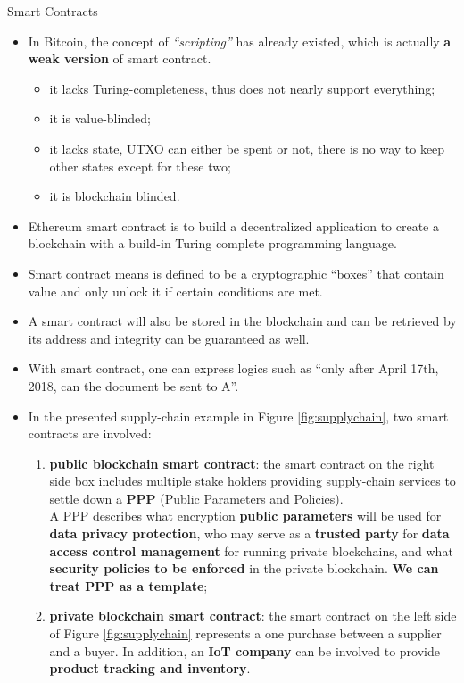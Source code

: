 \documentclass[11pt]{beamer}
\begin{document}
\begin{frame}[allowframebreaks]{Smart Contracts}
\begin{itemize}
\item In Bitcoin, the concept of \textit{“scripting”} has already existed, which is actually \textbf{a weak version} of smart contract.
\begin{itemize}
	\item it lacks Turing-completeness, thus does not nearly support everything;
	\item it is value-blinded;
	\item it lacks state, UTXO can either be spent or not, there is no way to keep other states except for these two;
	\item it is blockchain blinded.
\end{itemize}
\item Ethereum smart contract is to build a decentralized application to create a blockchain with a build-in Turing complete programming language.
\item Smart contract means is defined to be a cryptographic “boxes” that contain value and only unlock it if certain conditions are met.
\item A smart contract will also be stored in the blockchain and can be retrieved by its address and integrity can be guaranteed as well.
\item With smart contract, one can express logics such as “only after April 17th, 2018, can the document be sent to A”.
\item In the presented supply-chain example in Figure \ref{fig:supplychain}, two smart contracts are involved:
	\begin{enumerate}
	\item \textbf{public blockchain smart contract}: the smart contract on the right side box includes multiple stake holders providing supply-chain services to settle down a \textbf{PPP} (Public Parameters and Policies).\\A PPP describes what encryption \textbf{public parameters} will be used for \textbf{data privacy protection}, who may serve as a \textbf{trusted party} for \textbf{data access control management} for running private blockchains, and what \textbf{security policies to be enforced} in the private blockchain. \textbf{We can treat PPP as a template};
	\item \textbf{private blockchain smart contract}: the smart contract on the left side of Figure \ref{fig:supplychain} represents a one purchase between a supplier and a buyer. In addition, an \textbf{IoT company} can be involved to provide \textbf{product tracking and inventory}.
	\end{enumerate}
\end{itemize}
\end{frame}
\end{document}

